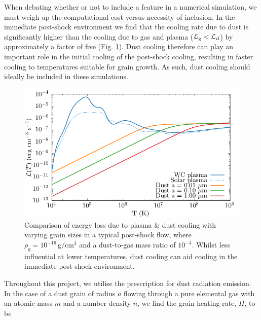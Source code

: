 
When debating whether or not to include a feature in a numerical simulation, we must weigh up the computational cost versus necessity of inclusion.
In the immediate post-shock environment we find that the cooling rate due to dust is significantly higher than the cooling due to gas and plasma ($\mathcal{L}_\text{g} < \mathcal{L}_\text{d}$) by approximately a factor of five (Fig. \ref{fig:postshockcoolcomparison-chapter3}).
Dust cooling therefore can play an important role in the initial cooling of the post-shock cooling, resulting in faster cooling to temperatures suitable for grain growth.
As such, dust cooling should ideally be included in these simulations.

\begin{figure}[h]
  \centering
  \includegraphics{assets/dust-plasma-cooling-comparison/cooling-comparison-forpaper2.pdf}
  \caption[Comparison of dust and plasma cooling rates in post-shock environment]{Comparison of energy loss due to plasma \& dust cooling with varying grain sizes in a typical post-shock flow, where $\rho_g = 10^{-16} \, \si{\gram\per\centi\metre\cubed}$ and a dust-to-gas mass ratio of $10^{-4}$. Whilst less influential at lower temperatures, dust cooling can aid cooling in the immediate post-shock environment.}
  \label{fig:postshockcoolcomparison-chapter3}
\end{figure}


Throughout this project, we utilise the \textcite{dwek_infrared_1981} prescription for dust radiation emission.
In the case of a dust grain of radius $a$ flowing through a pure elemental gas with an atomic mass $m$ and a number density $n$, we find the grain heating rate, $H$, to be 

